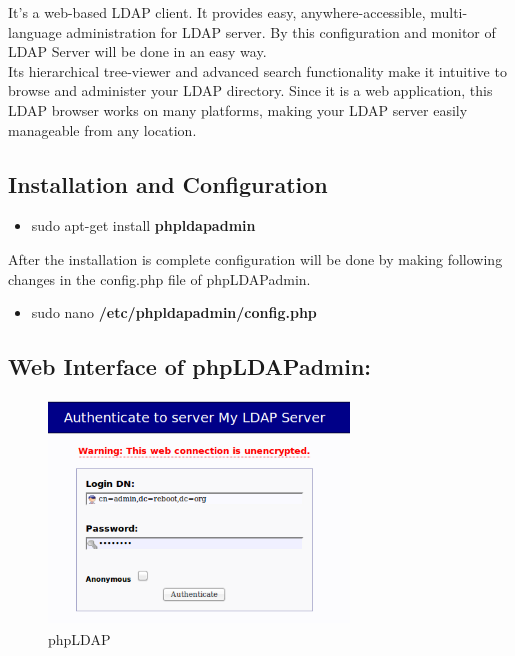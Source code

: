 \documentclass[12pt]{report}
\begin{document}
	It’s a web-based LDAP client. It provides easy, anywhere-accessible, multi-language administration for LDAP server. By this configuration and monitor of LDAP Server will be done in an easy way. \\
\underline{} \newline
Its hierarchical tree-viewer and advanced search functionality make it intuitive to browse and administer your LDAP directory. Since it is a web application, this LDAP browser works on many platforms, making your LDAP server easily manageable from any location.
\subsection{Installation and Configuration}
	\begin{itemize}
	\item sudo apt-get install \textbf{phpldapadmin}
	\end{itemize}
	
	After the installation is complete configuration will be done by making following changes in the
config.php file of phpLDAPadmin.
	\begin{itemize}
	\item sudo nano \textbf{/etc/phpldapadmin/config.php}
	\end{itemize}

	

\subsection{Web Interface of phpLDAPadmin:}

		\begin{figure}[H]
		\begin{center}
		\includegraphics[width=8cm,height=6cm]{Screens/LdapServerLogin.png}
		\caption{phpLDAP \label{fig: phpLDAP Image}}
		\end{center}
		\end{figure}
\end{document}
